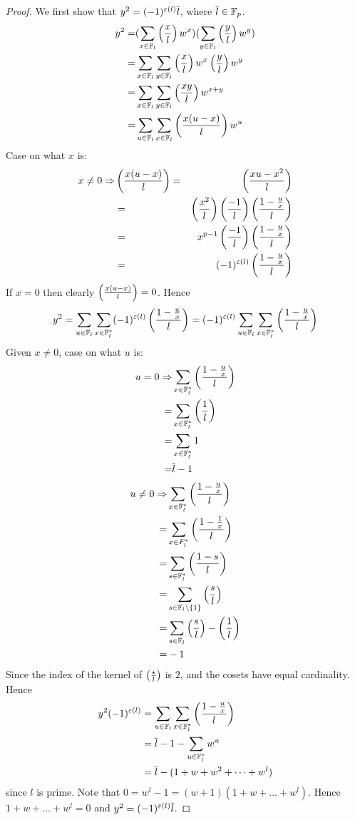 \begin{proof}
    We first show that $y^2 = (-1)^{\varepsilon(l)} \overline{l}$, 
    where $\overline{l} \in \mathbb{F}_p$.
    \begin{align*}
        y^2 =& 
        (\sum_{x \in \mathbb{F}_l} \left(\frac{x}{l}\right) w^x)
        (\sum_{y \in \mathbb{F}_l} \left(\frac{y}{l}\right) w^y)\\
        =& \sum_{x \in \mathbb{F}_l} \sum_{y \in \mathbb{F}_l} 
        \left(\frac{x}{l}\right) w^x \left(\frac{y}{l}\right) w^y\\
        =& \sum_{x \in \mathbb{F}_l} \sum_{y \in \mathbb{F}_l} \left(\frac{xy}{l}\right) w^{x+y}\\
        =& \sum_{u \in \mathbb{F}_l} \sum_{x \in \mathbb{F}_l} \left(\frac{x(u - x)}{l}\right) w^u
    \end{align*}
    Case on what $x$ is:
    \begin{align*}
        x \ne 0 \Rightarrow& \left(\frac{x(u - x)}{l}\right) =& \left(\frac{xu - x^2}{l}\right)\\
            & =& \left(\frac{x^2}{l}\right) \left(\frac{-1}{l}\right) \left(\frac{1-\frac{u}{x}}{l}\right)\\
            & =& x^{p - 1} \left(\frac{-1}{l}\right) \left(\frac{1 - \frac{u}{x}}{l}\right)\\
            & =& (-1)^{\varepsilon(l)} \left(\frac{1 - \frac{u}{x}}{l}\right)
    \end{align*}
    If $x = 0$ then clearly $\left(\frac{x(u - x)}{l}\right) = 0$.
    Hence 
    \[
        y^2 = \sum_{u \in \mathbb{F}_l} \sum_{x \in \mathbb{F}_l^*} 
        (-1)^{\varepsilon(l)} \left(\frac{1 - \frac{u}{x}}{l}\right)
        = (-1)^{\varepsilon(l)} \sum_{u \in \mathbb{F}_l}  \sum_{x \in \mathbb{F}_l^*}
        \left(\frac{1 - \frac{u}{x}}{l}\right)
    \]
    Given $x \ne 0$, case on what $u$ is:
    \begin{align*}
        u = 0 \Rightarrow &\sum_{x \in \mathbb{F}_l^*} \left(\frac{1 - \frac{u}{x}}{l}\right) \\
        = &\sum_{x \in \mathbb{F}_l^*} \left(\frac{1}{l}\right) \\
        = &\sum_{x \in \mathbb{F}_l^*} 1\\
        = & \overline{l} -1
    \end{align*}
    \begin{align*}
        u \ne 0 \Rightarrow &\sum_{x \in \mathbb{F}_l^*} \left(\frac{1 - \frac{u}{x}}{l}\right)\\
            = &\sum_{x \in F_l^*} \left(\frac{1 - \frac{1}{x}}{l}\right)\\
            = &\sum_{s \in \mathbb{F}_l^*} \left(\frac{1 - s}{l}\right)\\
            = &\sum_{s \in \mathbb{F}_l \setminus \left\{1\right\}} \left(\frac{s}{l}\right)\\
            = &\sum_{s \in \mathbb{F}_l} \left(\frac{s}{l}\right) - \left(\frac{1}{l}\right)\\
            = & - 1 
    \end{align*}
    Since the index of the kernel of $\left(\frac{\star}{l}\right)$ is $2$,
    and the cosets have equal cardinality.
    Hence 
    \begin{align*}
        y^2 (-1)^{\varepsilon(l)} &= \sum_{u \in \mathbb{F}_l}  \sum_{x \in \mathbb{F}_l^*}
            \left(\frac{1 - \frac{u}{x}}{l}\right)\\
            &= \overline{l} - 1 - \sum_{u \in \mathbb{F}_l^*} w^u\\
            &= \overline{l} - (1 + w + w^2 + \dots + w^l)
    \end{align*}
    since $l$ is prime. 
    Note that $0 = w^l - 1 = (w+1)(1+w + \dots + w^l)$.
    Hence $1+w + \dots + w^l = 0$ and $y^2 = (-1)^{\varepsilon(l)} \overline{l}$.


\end{proof}
